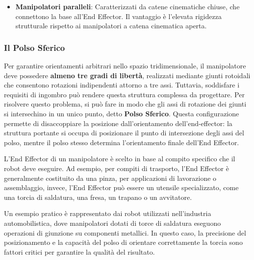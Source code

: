 \documentclass[11pt, a4paper]{report}
\begin{document}
\begin{itemize}
	\item \textbf{Manipolatori paralleli}: Caratterizzati da catene cinematiche chiuse, che connettono la base all'End Effector. Il vantaggio è l'elevata rigidezza strutturale rispetto ai manipolatori a catena cinematica aperta.
\end{itemize}

\subsubsection{Il Polso Sferico}
Per garantire orientamenti arbitrari nello spazio tridimensionale, il manipolatore deve possedere \textbf{almeno tre gradi di libertà}, realizzati mediante giunti rotoidali che consentono rotazioni indipendenti attorno a tre assi. Tuttavia, soddisfare i requisiti di ingombro può rendere questa struttura complessa da progettare. Per risolvere questo problema, si può fare in modo che gli assi di rotazione dei giunti si intersechino in un unico punto, detto \textbf{Polso Sferico}. Questa configurazione permette di disaccoppiare la posizione dall'orientamento dell'end-effector: la struttura portante si occupa di posizionare il punto di intersezione degli assi del polso, mentre il polso stesso determina l'orientamento finale dell'End Effector.

L'End Effector di un manipolatore è scelto in base al compito specifico che il robot deve eseguire. Ad esempio, per compiti di trasporto, l'End Effector è generalmente costituito da una pinza, per applicazioni di lavorazione o assemblaggio, invece, l'End Effector può essere un utensile specializzato, come una torcia di saldatura, una fresa, un trapano o un avvitatore.

Un esempio pratico è rappresentato dai robot utilizzati nell'industria automobilistica, dove manipolatori dotati di torce di saldatura eseguono operazioni di giunzione su componenti metallici. In questo caso, la precisione del posizionamento e la capacità del polso di orientare correttamente la torcia sono fattori critici per garantire la qualità del risultato.
\end{document}
